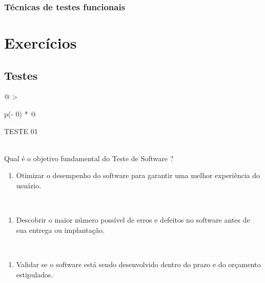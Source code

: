 \documentclass[
]{book}
\providecommand{\tightlist}{%
  \setlength{\itemsep}{0pt}\setlength{\parskip}{0pt}}
\begin{document}
\subsubsection{Técnicas de testes funcionais}\label{tuxe9cnicas-de-testes-funcionais}

\section{Exercícios}\label{exercuxedcios-1}

\subsection{Testes}\label{testes-1}

\begin{longtable}[]{@{}
  >{\raggedright\arraybackslash}p{(\columnwidth - 0\tabcolsep) * }@{}}
\toprule\noalign{}
\begin{minipage}[b]{\linewidth}\raggedright
TESTE 01
\end{minipage} \\
\midrule\noalign{}
\endhead
\bottomrule\noalign{}
\endlastfoot
Qual é o objetivo fundamental do Teste de Software ? \\
\begin{minipage}[t]{\linewidth}\raggedright
\begin{enumerate}
\def\labelenumi{\alph{enumi})}
\tightlist
\item
  Otimizar o desempenho do software para garantir uma melhor experiência do usuário.
\end{enumerate}
\end{minipage} \\
\begin{minipage}[t]{\linewidth}\raggedright
\begin{enumerate}
\def\labelenumi{\alph{enumi})}
\setcounter{enumi}{1}
\tightlist
\item
  Descobrir o maior número possível de erros e defeitos no software antes de sua entrega ou implantação.
\end{enumerate}
\end{minipage} \\
\begin{minipage}[t]{\linewidth}\raggedright
\begin{enumerate}
\def\labelenumi{\alph{enumi})}
\setcounter{enumi}{2}
\tightlist
\item
  Validar se o software está sendo desenvolvido dentro do prazo e do orçamento estipulados.

\end{enumerate}
\end{minipage}
\end{longtable}
\end{document}
